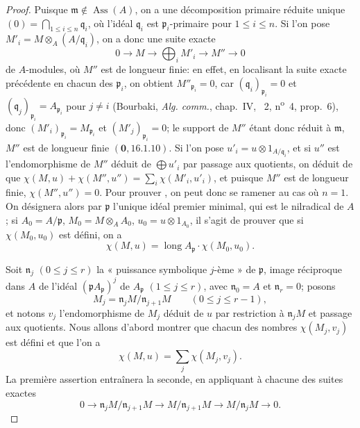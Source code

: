 \begin{proof}
Puisque $\mathfrak{m}\notin\operatorname{Ass}(A)$, on a une décomposition primaire réduite unique $(0)=\bigcap_{1\leq i\leq n}\mathfrak{q}_i$, où l'idéal $\mathfrak{q}_i$ est $\mathfrak{p}_i$-primaire pour $1\leq i\leq n$.
Si l'on pose $M'_i=M\otimes_A(A/\mathfrak{q}_i)$, on a donc une suite exacte
\[
  0\to M\to\bigoplus_iM'_i\to M''\to0
\]
de $A$-modules, où $M''$ est de longueur finie:
en effet, en localisant la suite exacte précédente en chacun des $\mathfrak{p}_i$, on obtient $M''_{\mathfrak{p}_i}=0$, car $(\mathfrak{q}_i)_{\mathfrak{p}_i}=0$ et $(\mathfrak{q}_j)_{\mathfrak{p}_i}=A_{\mathfrak{p}_i}$ pour $j\neq i$ (Bourbaki, \emph{Alg. comm.}, chap.~IV, \textsection~2, n\textsuperscript{o}~4, prop.~6), donc $(M'_i)_{\mathfrak{p}_i}=M_{\mathfrak{p}_i}$ et $(M'_j)_{\mathfrak{p}_i}=0$;
le support de $M''$ étant donc réduit à $\mathfrak{m}$, $M''$ est de longueur finie $(\mathbf{0},16.1.10)$.
Si l'on pose $u'_i=u\otimes1_{A/\mathfrak{q}_i}$, et si $u''$ est l'endomorphisme de $M''$ déduit de $\bigoplus u'_i$ par passage aux quotients, on déduit de  que $\chi(M,u)+\chi(M'',u'')=\sum_i\chi(M'_i,u'_i)$, et puisque $M''$ est de longueur finie, $\chi(M'',u'')=0$.
Pour prouver , on peut donc se ramener au cas où $n=1$.
On désignera alors par $\mathfrak{p}$ l'unique idéal premier minimal, qui est le nilradical de $A$;
si $A_0=A/\mathfrak{p}$, $M_0=M\otimes_AA_0$, $u_0=u\otimes1_{A_0}$, il s'agit de prouver que si $\chi(M_0,u_0)$ est défini, on a
\[
\label{IV.21.10.17.9}
  \chi(M,u)=\operatorname{long}A_{\mathfrak{p}}\cdot\chi(M_0,u_0).
  \tag{21.10.17.9}
\]

Soit $\mathfrak{n}_j$ $(0\leq j\leq r)$ la « puissance symbolique $j$-ème » de $\mathfrak{p}$, image réciproque dans $A$ de l'idéal $(\mathfrak{p}A_{\mathfrak{p}})^j$ de $A_{\mathfrak{p}}$ $(1\leq j\leq r)$, avec $\mathfrak{n}_0=A$ et $\mathfrak{n}_r=0$;
posons
\[
  M_j=\mathfrak{n}_jM/\mathfrak{n}_{j+1}M\qquad(0\leq j\leq r-1),
\]
et notons $v_j$ l'endomorphisme de $M_j$ déduit de $u$ par restriction à $\mathfrak{n}_jM$ et passage aux quotients.
Nous allons d'abord montrer que chacun des nombres $\chi(M_j,v_j)$ est défini et que l'on a
\[
\label{IV.21.10.17.10}
  \chi(M,u)=\sum_j\chi(M_j,v_j).
  \tag{21.10.17.10}
\]
La première assertion entraînera la seconde, en appliquant  à chacune des suites exactes
\[
  0\to\mathfrak{n}_jM/\mathfrak{n}_{j+1}M\to M/\mathfrak{n}_{j+1}M\to M/\mathfrak{n}_jM\to0.
\]


\end{proof}

